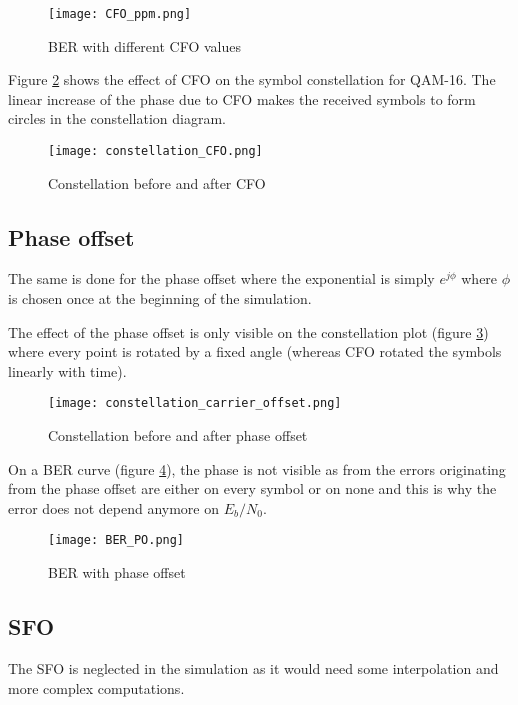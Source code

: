 \begin{figure}[H]
    \centering
    \texttt{[image: CFO\_ppm.png]}
    \caption{BER with different CFO values}
    \label{fig:CFO_BER}
\end{figure}

Figure \ref{fig:CFO_const} shows the effect of CFO on the symbol constellation for QAM-16. The linear increase of the phase due to CFO makes the received symbols to form circles in the constellation diagram. \par

\begin{figure}[H]
    \centering
    \texttt{[image: constellation\_CFO.png]}
    \caption{Constellation before and after CFO}
    \label{fig:CFO_const}
\end{figure}

\subsection{Phase offset}
The same is done for the phase offset where the exponential is simply $e^{j\phi}$ where $\phi$ is chosen once at the beginning of the simulation. \par

The effect of the phase offset is only visible on the constellation plot (figure \ref{fig:phaseOffsetConst}) where every point is rotated by a fixed angle (whereas CFO rotated the symbols linearly with time). \par

\begin{figure}[H]
    \centering
    \texttt{[image: constellation\_carrier\_offset.png]}
    \caption{Constellation before and after phase offset}
    \label{fig:phaseOffsetConst}
\end{figure}

On a BER curve (figure \ref{fig:BER_PO}), the phase is not visible as from the errors originating from the phase offset are either on every symbol or on none and this is why the error does not depend anymore on $E_b/N_0$. \par

\begin{figure}[H]
    \centering
    \texttt{[image: BER\_PO.png]}
    \caption{BER with phase offset}
    \label{fig:BER_PO}
\end{figure}

\subsection{SFO}
The SFO is neglected in the simulation as it would need some interpolation and more complex computations. \par

